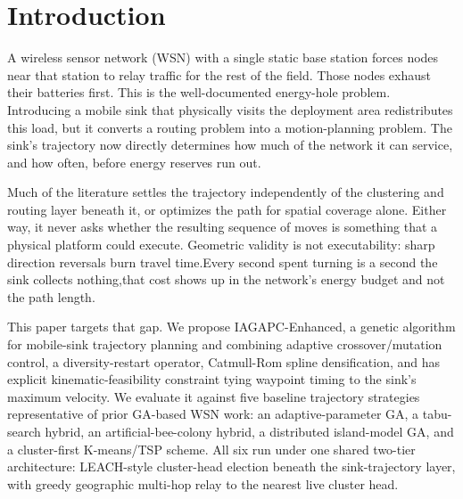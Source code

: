 \documentclass[runningheads]{llncs}
\begin{document}
\section{Introduction}
\label{sec:intro}

A wireless sensor network (WSN) with a single static base station forces
nodes near that station to relay traffic for the rest of the field. Those
nodes exhaust their batteries first. This is the well-documented
energy-hole problem. Introducing a mobile sink that physically visits the
deployment area redistributes this load, but it converts a routing problem
into a motion-planning problem. The sink's trajectory now directly
determines how much of the network it can service, and how often, before
energy reserves run out.

Much of the literature settles the trajectory independently of the
clustering and routing layer beneath it, or optimizes the path for spatial
coverage alone. Either way, it never asks whether the resulting sequence of
moves is something that a physical platform could execute. Geometric validity is
not executability: sharp direction reversals burn travel time.Every
second spent turning is a second the sink collects nothing,that cost shows
up in the network's energy budget and not the path length.

This paper targets that gap. We propose IAGAPC-Enhanced, a genetic
algorithm for mobile-sink trajectory planning and combining adaptive
crossover/mutation control, a diversity-restart operator, Catmull-Rom
spline densification, and has explicit kinematic-feasibility constraint
tying waypoint timing to the sink's maximum velocity. We evaluate it
against five baseline trajectory strategies representative of prior
GA-based WSN work: an adaptive-parameter GA, a tabu-search hybrid, an
artificial-bee-colony hybrid, a distributed island-model GA, and a
cluster-first K-means/TSP scheme. All six run under one shared two-tier
architecture: LEACH-style cluster-head election beneath the
sink-trajectory layer, with greedy geographic multi-hop relay to the
nearest live cluster head.
\end{document}
